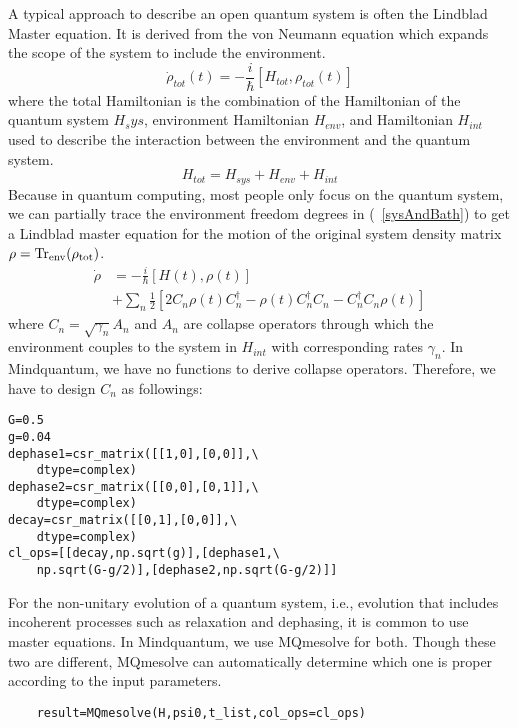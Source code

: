 A typical approach to describe an open quantum system is often the Lindblad Master equation. It is derived from the von Neumann equation which expands the scope of the system to include the environment.
\begin{equation}
    \dot{\rho}_{tot}(t)=-\frac{i}{\hbar}\left[H_{tot},\rho_{tot}(t)\right]
    \label{sysAndBath}
\end{equation}
where the total Hamiltonian is the combination of the Hamiltonian of the quantum system $H_sys$, environment Hamiltonian $H_{env}$, and Hamiltonian $H_{int}$ used to describe the interaction between the environment and the quantum system.
\begin{equation}
    H_{tot}=H_{sys}+H_{env}+H_{int}
\end{equation}
Because in quantum computing, most people only focus on the quantum system, we can partially trace the environment freedom degrees in (~\ref{sysAndBath}) to get a Lindblad master equation for the motion of the original system density matrix $\rho=\rm{Tr}_{env}(\rho_{tot})$.
\begin{equation}
\begin{split}
\dot{\rho}&=-\frac{i}{\hbar}\left[H(t),\rho(t)\right]\\
&+\sum_{n}\frac{1}{2}\left[2C_{n}\rho(t)C^{\dagger}_{n}-\rho(t)C_{n}^{\dagger}C_{n}-C_{n}^{\dagger}C_{n}\rho(t)\right]
\end{split}
\end{equation}
where $C_{n}=\sqrt{\gamma_{n}}A_{n}$ and $A_n$ are collapse operators through which the environment couples to the system in $H_{int}$ with corresponding rates $\gamma_{n}$. In Mindquantum, we have no functions to derive collapse operators. Therefore, we have to design $C_{n}$ as followings:
\begin{lstlisting}
G=0.5
g=0.04
dephase1=csr_matrix([[1,0],[0,0]],\
    dtype=complex)
dephase2=csr_matrix([[0,0],[0,1]],\
    dtype=complex)
decay=csr_matrix([[0,1],[0,0]],\
    dtype=complex)
cl_ops=[[decay,np.sqrt(g)],[dephase1,\
    np.sqrt(G-g/2)],[dephase2,np.sqrt(G-g/2)]]
\end{lstlisting}
For the non-unitary evolution of a quantum system, i.e., evolution that includes incoherent processes such as relaxation and dephasing, it is common to use master equations. In Mindquantum, we use MQmesolve for both. Though these two are different, MQmesolve can automatically determine which one is proper according to the input parameters.
\begin{lstlisting}
    result=MQmesolve(H,psi0,t_list,col_ops=cl_ops)
\end{lstlisting}


